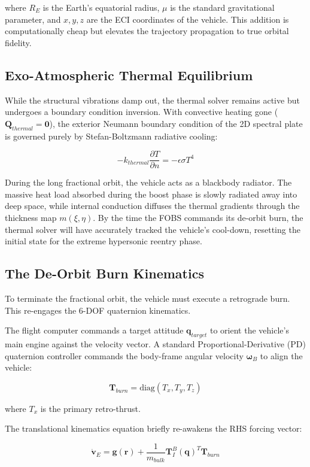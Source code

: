 \documentclass[11pt,a4paper]{article}
\theoremstyle{definition}
\numberwithin{equation}{section}
\begin{document}
where $R_E$ is the Earth's equatorial radius, $\mu$ is the standard gravitational parameter, and $x, y, z$ are the ECI coordinates of the vehicle. This addition is computationally cheap but elevates the trajectory propagation to true orbital fidelity.

\subsection{Exo-Atmospheric Thermal Equilibrium}
While the structural vibrations damp out, the thermal solver remains active but undergoes a boundary condition inversion. With convective heating gone ($\mathbf{Q}_{thermal} = \mathbf{0}$), the exterior Neumann boundary condition of the 2D spectral plate is governed purely by Stefan-Boltzmann radiative cooling:

$$-k_{thermal} \frac{\partial T}{\partial n} = -\epsilon \sigma T^4$$

During the long fractional orbit, the vehicle acts as a blackbody radiator. The massive heat load absorbed during the boost phase is slowly radiated away into deep space, while internal conduction diffuses the thermal gradients through the thickness map $m(\xi, \eta)$. By the time the FOBS commands its de-orbit burn, the thermal solver will have accurately tracked the vehicle's cool-down, resetting the initial state for the extreme hypersonic reentry phase.

\subsection{The De-Orbit Burn Kinematics}
To terminate the fractional orbit, the vehicle must execute a retrograde burn. This re-engages the 6-DOF quaternion kinematics.

The flight computer commands a target attitude $\mathbf{q}_{target}$ to orient the vehicle's main engine against the velocity vector. A standard Proportional-Derivative (PD) quaternion controller commands the body-frame angular velocity $\boldsymbol{\omega}_B$ to align the vehicle:

$$\mathbf{T}_{burn} = \text{diag}(T_x, T_y, T_z)$$

where $T_x$ is the primary retro-thrust.

The translational kinematics equation briefly re-awakens the RHS forcing vector:

$$\mathbf{\dot{v}}_E = \mathbf{g}(\mathbf{r}) + \frac{1}{m_{bulk}} \mathbf{T}_I^B(\mathbf{q})^T \mathbf{T}_{burn}$$
\end{document}
